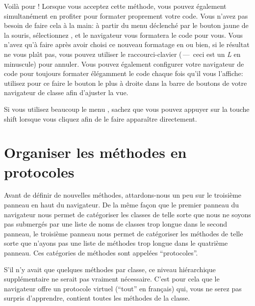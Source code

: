 \documentclass[a4paper,10pt,twoside]{book}
\begin{document}
Voilà pour !  Lorsque vous acceptez cette méthode, vous
pouvez également simultanément en profiter pour formater proprement
votre code. Vous n'avez pas besoin de faire cela à la main: à partir
du menu d\'eclench\'e par le bouton jaune de la souris, sélectionnez
, et le navigateur vous formatera
le code pour vous. Vous n'avez qu'à faire  après avoir 
choisi ce nouveau formatage en  ou 
bien, si le r\'esultat ne vous pla\^{\i}t pas, vous pouvez utiliser 
le raccourci-clavier 
(\,---\, ceci est un \emph{L} en minuscule) pour annuler.
Vous pouvez également configurer votre navigateur de code pour
toujours formater \'el\'egamment le code chaque fois qu'il vous
l'affiche:
utilisez pour ce faire le bouton le plus à droite dans la barre de
boutons de votre navigateur de classe afin d'ajuster la vue.

Si vous utilisez beaucoup le menu , sachez que
vous pouvez appuyer sur la touche {\sc shift} lorsque vous cliquez
afin de le faire apparaître directement.

\section{Organiser les méthodes en protocoles}

Avant de définir de nouvelles méthodes, attardons-nous un peu sur le troisième panneau en haut du navigateur.
De la même façon que le premier panneau du navigateur nous permet de catégoriser les classes de telle sorte que nous ne soyons pas submergés par une liste de noms de classes trop longue dans le second panneau, le troisième panneau nous permet de catégoriser les méthodes de telle sorte que n'ayons pas une liste de méthodes trop longue dans le quatrième panneau.
Ces catégories de méthodes sont appelées ``protocoles''.

S'il n'y avait que quelques méthodes par classe, ce niveau hiérarchique supplémentaire ne serait pas vraiment nécessaire.
C'est pour cela que le navigateur offre un protocole virtuel
 (\cad ``tout'' en fran\c{c}ais) qui, vous ne serez pas surpris d'apprendre, contient toutes les méthodes de la classe.
\end{document}
